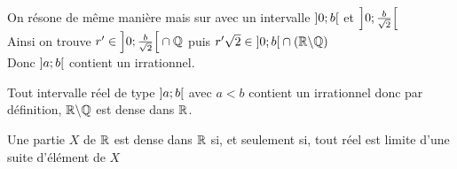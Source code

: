 \begin{dem}
\begin{itemize}
\begin{itemize}
            On résone de même manière mais sur avec un intervalle \(\left]0;b\right[\) et \(\left]0;\frac{b}{\sqrt{2}}\right[\)\\
            Ainsi on trouve \(r'\in \left]0;\frac{b}{\sqrt{2}}\right[\cap \mathbb{Q}\) puis \(r'\sqrt{2} \in \left]0;b\right[\cap\left(\mathbb{R}\backslash\mathbb{Q}\right)\)\\
            Donc \(\left]a;b\right[\) contient un irrationnel.
        \end{itemize}
    \end{itemize}
    \conclusion Tout intervalle réel de type \(\left]a;b\right[\) avec \(a<b\) contient un irrationnel donc par définition, \(\mathbb{R}\backslash\mathbb{Q}\) est dense dans \(\mathbb{R}\).
\end{dem}

\begin{theo}
    Une partie \(X\) de \(\mathbb{R}\) est dense dans \(\mathbb{R}\) si, et seulement si, tout réel est limite d'une suite d'élément de \(X\)
\end{theo}
